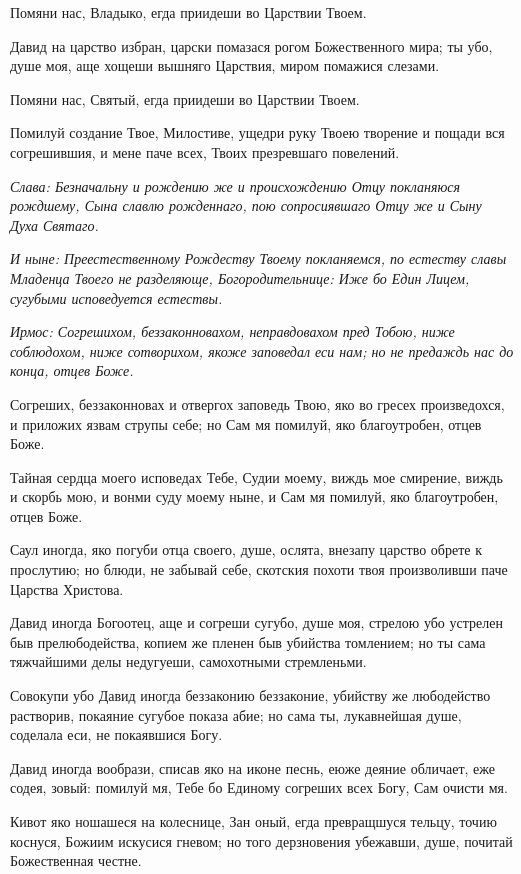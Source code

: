 Помяни нас, Владыко, егда приидеши во Царствии Твоем.


Давид на царство избран, царски помазася рогом Божественного мира; ты убо, душе моя, аще хощеши вышняго Царствия, миром помажися слезами.


Помяни нас, Святый, егда приидеши во Царствии Твоем.


Помилуй создание Твое, Милостиве, ущедри руку Твоею творение и пощади вся согрешившия, и мене паче всех, Твоих презревшаго повелений.


\itshape Слава\normalfont{}: Безначальну и рождению же и происхождению Отцу покланяюся рождшему, Сына славлю рожденнаго, пою сопросиявшаго Отцу же и Сыну Духа Святаго.


\itshape И ныне\normalfont{}: Преестественному Рождеству Твоему покланяемся, по естеству славы Младенца Твоего не разделяюще, Богородительнице: Иже бо Един Лицем, сугубыми исповедуется естествы. 




\itshape Ирмос\normalfont{}: Согрешихом, беззаконновахом, неправдовахом пред Тобою, ниже соблюдохом, ниже сотворихом, якоже заповедал еси нам; но не предаждь нас до конца, отцев Боже.


Согреших, беззаконновах и отвергох заповедь Твою, яко во гресех произведохся, и приложих язвам струпы себе; но Сам мя помилуй, яко благоутробен, отцев Боже.


Тайная сердца моего исповедах Тебе, Судии моему, виждь мое смирение, виждь и скорбь мою, и вонми суду моему ныне, и Сам мя помилуй, яко благоутробен, отцев Боже.


Саул иногда, яко погуби отца своего, душе, ослята, внезапу царство обрете к прослутию; но блюди, не забывай себе, скотския похоти твоя произволивши паче Царства Христова.


Давид иногда Богоотец, аще и согреши сугубо, душе моя, стрелою убо устрелен быв прелюбодейства, копием же пленен быв убийства томлением; но ты сама тяжчайшими делы недугуеши, самохотными стремленьми.


Совокупи убо Давид иногда беззаконию беззаконие, убийству же любодейство растворив, покаяние сугубое показа абие; но сама ты, лукавнейшая душе, соделала еси, не покаявшися Богу.


Давид иногда вообрази, списав яко на иконе песнь, еюже деяние обличает, еже содея, зовый: помилуй мя, Тебе бо Единому согреших всех Богу, Сам очисти мя.


Кивот яко ношашеся на колеснице, Зан оный, егда превращшуся тельцу, точию коснуся, Божиим искусися гневом; но того дерзновения убежавши, душе, почитай Божественная честне.


